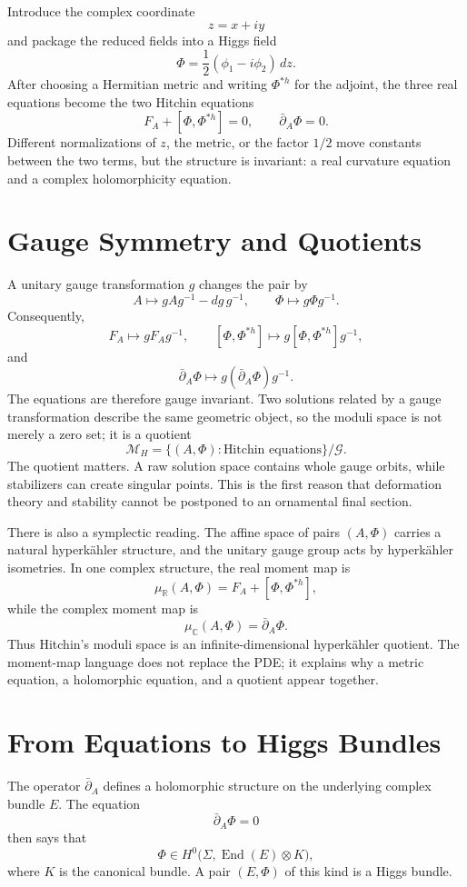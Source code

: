 Introduce the complex coordinate
\[
  z=x+iy
\]
and package the reduced fields into a Higgs field
\[
  \Phi=\frac12(\phi_1-i\phi_2)\,dz.
\]
After choosing a Hermitian metric and writing \(\Phi^{*h}\) for the adjoint, the three real equations become the two Hitchin equations
\[
  \boxed{
  F_A+[\Phi,\Phi^{*h}]=0,
  \qquad
  \bar\partial_A\Phi=0.}
\]
Different normalizations of \(z\), the metric, or the factor \(1/2\) move constants between the two terms, but the structure is invariant: a real curvature equation and a complex holomorphicity equation.

\section{Gauge Symmetry and Quotients}

A unitary gauge transformation \(g\) changes the pair by
\[
  A\longmapsto gAg^{-1}-dg\,g^{-1},
  \qquad
  \Phi\longmapsto g\Phi g^{-1}.
\]
Consequently,
\[
  F_A\longmapsto gF_Ag^{-1},
  \qquad
  [\Phi,\Phi^{*h}]\longmapsto
  g[\Phi,\Phi^{*h}]g^{-1},
\]
and
\[
  \bar\partial_A\Phi
  \longmapsto
  g(\bar\partial_A\Phi)g^{-1}.
\]
The equations are therefore gauge invariant.  Two solutions related by a gauge transformation describe the same geometric object, so the moduli space is not merely a zero set; it is a quotient
\[
  \mathcal M_H
  =\{(A,\Phi):\text{Hitchin equations}\}/\mathcal G.
\]
The quotient matters.  A raw solution space contains whole gauge orbits, while stabilizers can create singular points.  This is the first reason that deformation theory and stability cannot be postponed to an ornamental final section.

There is also a symplectic reading.  The affine space of pairs \((A,\Phi)\) carries a natural hyperkähler structure, and the unitary gauge group acts by hyperkähler isometries.  In one complex structure, the real moment map is
\[
  \mu_{\mathbb R}(A,\Phi)
  =F_A+[\Phi,\Phi^{*h}],
\]
while the complex moment map is
\[
  \mu_{\mathbb C}(A,\Phi)
  =\bar\partial_A\Phi.
\]
Thus Hitchin's moduli space is an infinite-dimensional hyperkähler quotient.  The moment-map language does not replace the PDE; it explains why a metric equation, a holomorphic equation, and a quotient appear together.

\section{From Equations to Higgs Bundles}

The operator \(\bar\partial_A\) defines a holomorphic structure on the underlying complex bundle \(E\).  The equation
\[
  \bar\partial_A\Phi=0
\]
then says that
\[
  \Phi\in H^0\bigl(\Sigma,\operatorname{End}(E)\otimes K\bigr),
\]
where \(K\) is the canonical bundle.  A pair \((E,\Phi)\) of this kind is a Higgs bundle.

